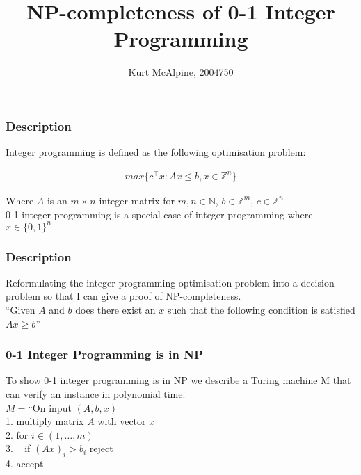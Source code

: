 \documentclass[mathserif]{beamer}
\title{NP-completeness of 0-1 Integer Programming}
\author{Kurt McAlpine, 2004750}
\begin{document}
\frame{\titlepage}

\begin{frame}
\frametitle{Description}

Integer programming is defined as the following optimisation problem:

\begin{align}
	max \{ c^\top x : Ax \leq b, x \in \mathbb{Z}^n\}
\end{align}

Where $A$ is an $m \times n$ integer matrix for $m,n \in \mathbb{N}$, $b \in
\mathbb{Z}^m$, $c \in \mathbb{Z}^n$\\

0-1 integer programming is a special case of integer programming where $x \in
\{0,1\}^n$

\end{frame}

\begin{frame}
\frametitle{Description}

Reformulating the integer programming optimisation problem into a decision
problem so that I can give a proof of NP-completeness.\\

``Given $A$ and $b$ does there exist an $x$ such that the following condition
is satisfied $Ax \geq b$''

\end{frame}

\begin{frame}
\frametitle{0-1 Integer Programming is in NP}

To show 0-1 integer programming is in NP we describe a Turing machine M that
can verify an instance in polynomial time.\\

$M = $``On input $(A, b, x)$\\
1. multiply matrix $A$ with vector $x$\\
2. for $i \in (1,\ldots,m)$\\
3. ~ if $(Ax)_i > b_i$ reject\\
4. accept

\end{frame}
\end{document}
